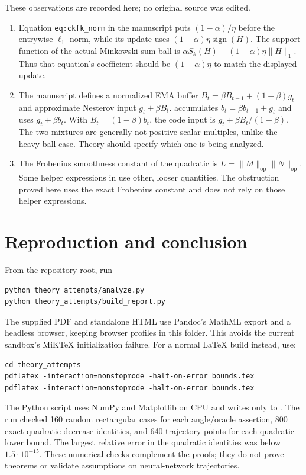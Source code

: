 \documentclass[11pt]{article}
\newcommand{\op}[1]{\lVert #1\rVert_{\mathrm{op}}}
\newcommand{\ent}[1]{\lVert #1\rVert_1}
\newcommand{\sgn}{\operatorname{sign}}
\begin{document}
These observations are recorded here; no original source was edited.
\begin{enumerate}
\item Equation \texttt{eq:ckfk\_norm} in the manuscript puts
$(1-\alpha)/\eta$ before the entrywise $\ell_1$ norm, while its update uses
$(1-\alpha)\eta\sgn(H)$. The support function of the actual Minkowski-sum
ball is $\alpha S_k(H)+(1-\alpha)\eta\ent H$. Thus that equation's
coefficient should be $(1-\alpha)\eta$ to match the displayed update.
\item The manuscript defines a normalized EMA buffer
$B_t=\beta B_{t-1}+(1-\beta)g_t$ and approximate Nesterov input $g_t+\beta B_t$.
 accumulates $b_t=\beta b_{t-1}+g_t$ and uses
$g_t+\beta b_t$. With $B_t=(1-\beta)b_t$, the code input is
$g_t+\beta B_t/(1-\beta)$. The two mixtures are generally not positive
scalar multiples, unlike the heavy-ball case. Theory should specify which
one is being analyzed.
\item The Frobenius smoothness constant of the quadratic is
$L=\op M\op N$. Some helper expressions in
 use other, looser quantities.
The obstruction proved here uses the exact Frobenius constant and does
not rely on those helper expressions.
\end{enumerate}

\section{Reproduction and conclusion}

From the repository root, run
\begin{verbatim}
python theory_attempts/analyze.py
python theory_attempts/build_report.py
\end{verbatim}
The supplied PDF and standalone HTML use Pandoc's MathML export and a
headless browser, keeping browser profiles in this folder. This avoids
the current sandbox's MiKTeX initialization failure. For a normal LaTeX
build instead, use:
\begin{verbatim}
cd theory_attempts
pdflatex -interaction=nonstopmode -halt-on-error bounds.tex
pdflatex -interaction=nonstopmode -halt-on-error bounds.tex
\end{verbatim}
The Python script uses NumPy and Matplotlib on CPU and writes only to
. The run checked 160 random rectangular cases
for each angle/oracle assertion, 800 exact quadratic decrease identities,
and 640 trajectory points for each quadratic lower bound. The largest
relative error in the quadratic identities was below $1.5\cdot10^{-15}$.
These numerical checks complement the proofs; they do not prove theorems
or validate assumptions on neural-network trajectories.
\end{document}
